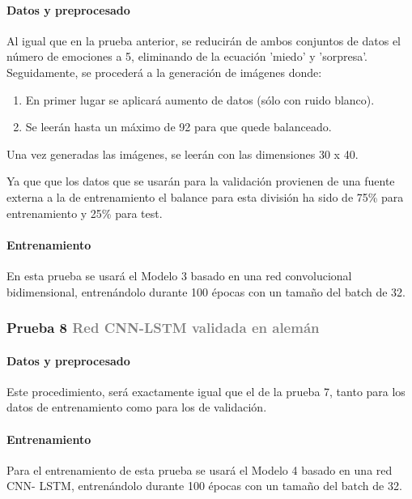 \documentclass[11pt,a4paper,spanish]{book}
\begin{document}
	\hfill\begin{minipage}{\dimexpr\textwidth-1cm}
		\paragraph{Datos y preprocesado} Al igual que en la prueba anterior, se reducirán de ambos conjuntos de datos el número de emociones a 5, eliminando de la ecuación 'miedo' y 'sorpresa'. Seguidamente, se procederá a la generación de imágenes donde:
		\begin{enumerate}
			\item En primer lugar se aplicará aumento de datos (sólo con ruido blanco).
			\item Se leerán hasta un máximo de 92 para que quede balanceado.
		\end{enumerate}
		Una vez generadas las imágenes, se leerán con las dimensiones 30 x 40.
		
		Ya que que los datos que se usarán para la validación provienen de una fuente externa a la de entrenamiento el balance para esta división ha sido de 75\% para entrenamiento y 25\% para test. 
	
		\paragraph{Entrenamiento} En esta prueba se usará el Modelo 3 basado en una red convolucional bidimensional, entrenándolo durante 100 épocas con un tamaño del batch de 32.
		
	\end{minipage}

	\subsubsection[]{\large Prueba 8 {\normalsize \textcolor{Gray}{Red CNN-LSTM validada en alemán}}}
	
	\hfill\begin{minipage}{\dimexpr\textwidth-1cm}
		
		\paragraph{Datos y preprocesado}  Este procedimiento, será exactamente igual que el de la prueba 7, tanto para los datos de entrenamiento como para los de validación.
		
		\paragraph{Entrenamiento} Para el entrenamiento de esta prueba se usará el Modelo 4 basado en una red CNN- LSTM, entrenándolo durante 100 épocas con un tamaño del batch de 32.
		
	\end{minipage}
\end{document}
